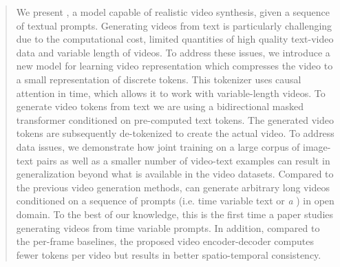 \begin{abstract}
We present \model, a model capable of realistic video synthesis, given a sequence of textual prompts. Generating videos from text is particularly challenging due to the computational cost, limited quantities of high quality text-video data and variable length of videos. To address these issues, we introduce a new model for learning video representation which compresses the video to a small representation of discrete tokens. This tokenizer uses causal attention in time, which allows it to work with variable-length videos. 
To generate video tokens from text we are using a bidirectional masked transformer conditioned on pre-computed text tokens. The generated video tokens are subsequently de-tokenized to create the actual video. To address data issues, we demonstrate how joint training on a large corpus of image-text pairs as well as a smaller number of video-text examples can result in generalization beyond what is available in the video datasets. Compared to the previous video generation methods, \model can generate arbitrary long videos conditioned on a sequence of prompts (i.e. time variable text or \textit{a \story}) in open domain. To the best of our knowledge, this is the first time a paper studies generating videos from time variable prompts. In addition, compared to the per-frame baselines, the proposed video encoder-decoder computes fewer tokens per video but results in better spatio-temporal consistency.


\end{abstract}